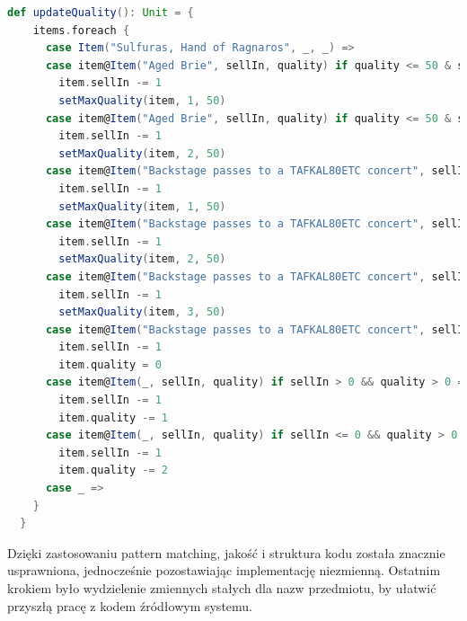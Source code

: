 \documentclass[a4paper, 11pt]{article}
\begin{document}
\begin{lstlisting}[language=scala]
  def updateQuality(): Unit = {
    items.foreach {
      case Item("Sulfuras, Hand of Ragnaros", _, _) =>
      case item@Item("Aged Brie", sellIn, quality) if quality <= 50 & sellIn >= 0 =>
        item.sellIn -= 1
        setMaxQuality(item, 1, 50)
      case item@Item("Aged Brie", sellIn, quality) if quality <= 50 & sellIn < 0 =>
        item.sellIn -= 1
        setMaxQuality(item, 2, 50)
      case item@Item("Backstage passes to a TAFKAL80ETC concert", sellIn, quality) if quality < 50 && sellIn > 10 =>
        item.sellIn -= 1
        setMaxQuality(item, 1, 50)
      case item@Item("Backstage passes to a TAFKAL80ETC concert", sellIn, quality) if quality < 50 && sellIn > 5 =>
        item.sellIn -= 1
        setMaxQuality(item, 2, 50)
      case item@Item("Backstage passes to a TAFKAL80ETC concert", sellIn, quality) if quality < 50 && sellIn > 0 =>
        item.sellIn -= 1
        setMaxQuality(item, 3, 50)
      case item@Item("Backstage passes to a TAFKAL80ETC concert", sellIn, _) if sellIn <= 0 =>
        item.sellIn -= 1
        item.quality = 0
      case item@Item(_, sellIn, quality) if sellIn > 0 && quality > 0 =>
        item.sellIn -= 1
        item.quality -= 1
      case item@Item(_, sellIn, quality) if sellIn <= 0 && quality > 0 =>
        item.sellIn -= 1
        item.quality -= 2
      case _ =>
    }
  }
\end{lstlisting}
Dzięki zastosowaniu pattern matching, jakość i struktura kodu została znacznie usprawniona, jednocześnie pozostawiając implementację niezmienną. Ostatnim krokiem było wydzielenie zmiennych stałych dla nazw przedmiotu, by ułatwić przyszłą pracę z kodem źródłowym systemu.
\end{document}
